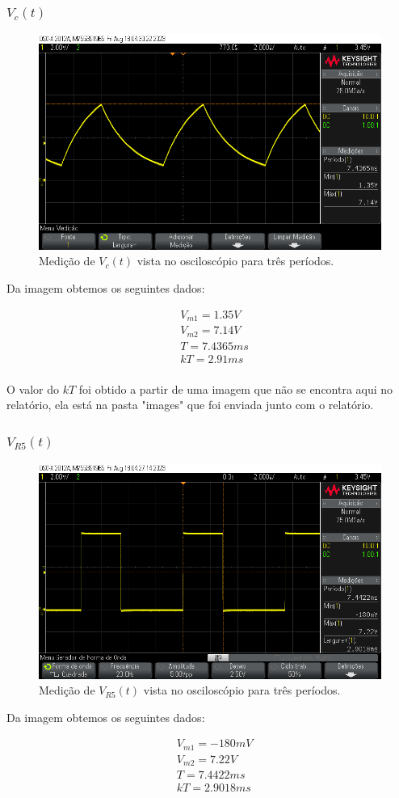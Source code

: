 \subsubsection{$V_c (t)$}

\begin{figure}[h]
    \centering
    \includegraphics[width=0.7\columnwidth]{images/ex2_vc.png}
    \caption{Medição de $V_c(t)$ vista no osciloscópio para três períodos.}
\end{figure}

Da imagem obtemos os seguintes dados:

\begin{equation}
    \begin{aligned}
         & V_{m1} = 1.35V \\
         & V_{m2} = 7.14V \\
         & T = 7.4365ms   \\
         & kT =  2.91ms   \\
    \end{aligned}
\end{equation}

O valor do $kT$ foi obtido a partir de uma imagem que não se encontra aqui no relatório, ela está na pasta "images" que foi enviada junto com o relatório.

\subsubsection{$V_{R5} (t)$}

\begin{figure}[h]
    \centering
    \includegraphics[width=0.7\columnwidth]{images/ex2_r5.png}
    \caption{Medição de $V_{R5}(t)$ vista no osciloscópio para três períodos.}
\end{figure}

Da imagem obtemos os seguintes dados:

\begin{equation}
    \begin{aligned}
         & V_{m1} = -180mV \\
         & V_{m2} = 7.22V  \\
         & T = 7.4422ms    \\
         & kT =  2.9018ms  \\
    \end{aligned}
\end{equation}